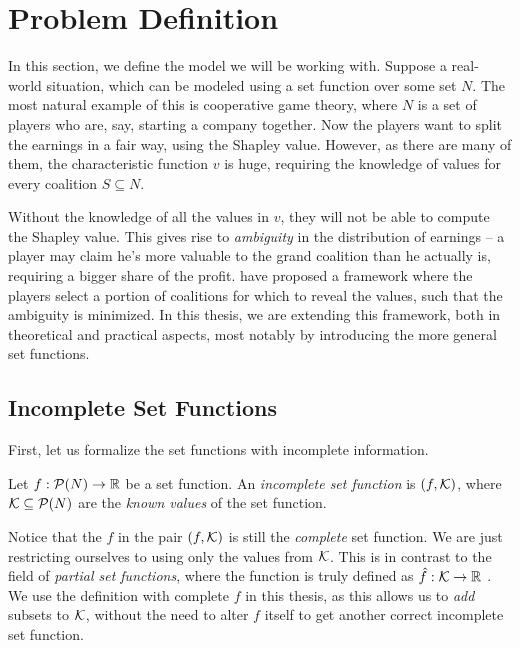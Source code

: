 \chapter{Problem Definition}

In this section, we define the model we will be working with.
Suppose a real-world situation, which can be modeled using a set function over some set $ N $.
The most natural example of this is cooperative game theory, where $ N $ is a set of players who are, say, starting a company together.
Now the players want to split the earnings in a fair way, using the Shapley value.
However, as there are many of them, the characteristic function $ v $ is huge, requiring the knowledge of values for every coalition $ S \subseteq N $.

Without the knowledge of all the values in $ v $, they will not be able to compute the Shapley value.
This gives rise to \emph{ambiguity} in the distribution of earnings -- a player may claim he's more valuable to the grand coalition than he actually is, requiring a bigger share of the profit.
\cite{uradnik2024reducing} have proposed a framework where the players select a portion of coalitions for which to reveal the values, such that the ambiguity is minimized.
In this thesis, we are extending this framework, both in theoretical and practical aspects, most notably by introducing the more general set functions.

\section{Incomplete Set Functions}

First, let us formalize the set functions with incomplete information.

\begin{defi}
  Let $ f: \mathcal{P}\!\left(N\right) \to \mathbb{R} $ be a set function.
  An \emph{incomplete set function} is $ \left( f, \mathcal{K} \right) $, where $ \mathcal{K} \subseteq \mathcal{P}\!\left(N\right) $ are the \emph{known values} of the set function.
\end{defi}

Notice that the $ f $ in the pair $ \left( f, \mathcal{K} \right) $ is still the \emph{complete} set function.
We are just restricting ourselves to using only the values from $ \mathcal{K} $.
This is in contrast to the field of \emph{partial set functions}, where the  function is truly defined as $ \hat f: \mathcal{K} \to \mathbb{R} $ \citep{CERNY202462}.
We use the definition with complete $ f $ in this thesis, as this allows us to \emph{add} subsets to $ \mathcal{K} $, without the need to alter $ f $ itself to get another correct incomplete set function.

